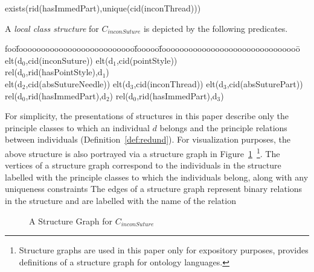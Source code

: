 \begin{example}
{{\begin{tabbing}
\> exists(rid(hasImmedPart),unique(cid(inconThread)))
\end{tabbing}
} }
\noindent
A {\em local class structure} for $C_{inconSuture}$ is depicted by the
following predicates.
{\it {\small
\begin{tabbing}
foo\=foooooooooooooooooooooooooo\=fooooo\=fooooooooooooooooooooooooooooooo\=\kill
\> elt(d$_0$,cid(inconSuture)) 
		\> \> elt(d$_1$,cid(pointStyle)) \\
\> rel(d$_0$,rid(hasPointStyle),d$_1$) \\
\> elt(d$_2$,cid(absSutureNeedle))
	\> \> elt(d$_3$,cid(inconThread)) \> elt(d$_3$,cid(absSuturePart)) \\
\> rel(d$_0$,rid(hasImmedPart),d$_2$) 
		\> \> rel(d$_0$,rid(hasImmedPart),d$_3$) 
\end{tabbing}
} }
\noindent
For simplicity, the presentations of structures in this paper describe
only the principle classes to which an individual $d$ belongs and the
principle relations between individuals (Definition~\ref{def:redund}).
For visualization purposes, the above structure is also portrayed via
a structure graph in Figure~\ref{fig:struct1}~\footnote{Structure
graphs are used in this paper only for expository purposes,
\cite{Swif04} provides definitions of a structure graph for ontology
languages.}.  The vertices of a structure graph correspond to the
individuals in the structure labelled with the principle classes to
which the individuals belong, along with any uniqueness constraints
The edges of a structure graph represent binary relations in the
structure and are labelled with the name of the relation
\begin{figure}[htbp] 
\caption{A Structure Graph for $C_{inconSuture}$}
\label{fig:struct1}
\end{figure}


\end{example}
